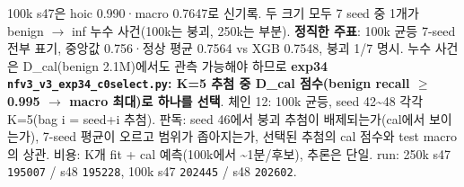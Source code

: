 100k s47은 hoic 0.990·macro 0.7647로 신기록. 두 크기 모두 7 seed 중 1개가 benign \ensuremath{\rightarrow} inf 누수 사건(100k는 붕괴, 250k는 부분). \textbf{정직한 주표}: 100k 균등 7-seed 전부 표기, 중앙값 0.756·정상 평균 0.7564 vs XGB 0.7548, 붕괴 1/\allowbreak{}7 명시. 누수 사건은 D\_\allowbreak{}cal(benign 2.1M)에서도 관측 가능해야 하므로 \textbf{exp34 \texttt{nfv3\_\allowbreak{}\allowbreak{}v3\_\allowbreak{}\allowbreak{}exp34\_\allowbreak{}\allowbreak{}c0\allowbreak{}select.\allowbreak{}p\allowbreak{}y}: K=\allowbreak{}5 추첨 중 D\_\allowbreak{}cal 점수(benign recall \ensuremath{\geq}0.995  \ensuremath{\rightarrow}  macro 최대)로 하나를 선택}. 체인 12: 100k 균등, seed 42\textasciitilde{}48 각각 K=\allowbreak{}5(bag i =\allowbreak{} seed+\allowbreak{}i 추첨). 판독: seed 46에서 붕괴 추첨이 배제되는가(cal에서 보이는가), 7-seed 평균이 오르고 범위가 좁아지는가, 선택된 추첨의 cal 점수와 test macro의 상관. 비용: K개 fit +\allowbreak{} cal 예측(100k에서 \textasciitilde{}1분/\allowbreak{}후보), 추론은 단일. run: 250k s47 \texttt{195007} /\allowbreak{} s48 \texttt{195228}, 100k s47 \texttt{202445} /\allowbreak{} s48 \texttt{202602}.

